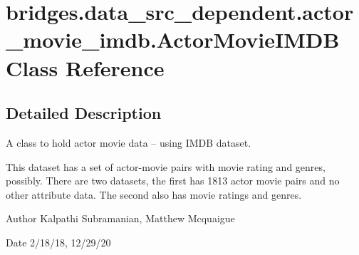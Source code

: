 \hypertarget{classbridges_1_1data__src__dependent_1_1actor__movie__imdb_1_1_actor_movie_i_m_d_b}{}\section{bridges.\+data\+\_\+src\+\_\+dependent.\+actor\+\_\+movie\+\_\+imdb.\+Actor\+Movie\+I\+M\+DB Class Reference}
\label{classbridges_1_1data__src__dependent_1_1actor__movie__imdb_1_1_actor_movie_i_m_d_b}


\subsection{Detailed Description}
A class to hold actor movie data -- using I\+M\+DB dataset. 

This dataset has a set of actor-\/movie pairs with movie rating and genres, possibly. There are two datasets, the first has 1813 actor movie pairs and no other attribute data. The second also has movie ratings and genres.

\begin{DoxyAuthor}{Author}
Kalpathi Subramanian, Matthew Mcquaigue
\end{DoxyAuthor}
\begin{DoxyDate}{Date}
2/18/18, 12/29/20 
\end{DoxyDate}
